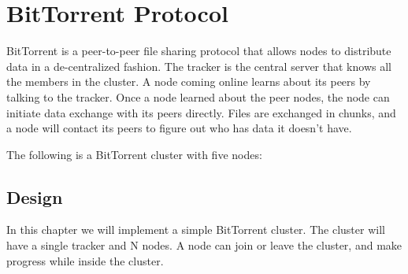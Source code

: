 % 

\usetikzlibrary{arrows.meta} %

\chapter{BitTorrent Protocol}

BitTorrent is a peer-to-peer file sharing protocol that allows nodes to 
distribute data in a de-centralized fashion. The tracker is the central server
that knows all the members in the cluster. A node coming online learns about its
peers by talking to the tracker. Once a node learned about the peer nodes, the
node can initiate data exchange with its peers directly. Files are exchanged in 
chunks, and a node will contact its peers to figure out who has data it doesn't
have.

\pagebreak

The following is a BitTorrent cluster with five nodes:

\begin{center}
\end{center}

\section{Design}

In this chapter we will implement a simple BitTorrent cluster. The cluster will
have a single tracker and N nodes. A node can join or leave the cluster, and
make progress while inside the cluster.\\

